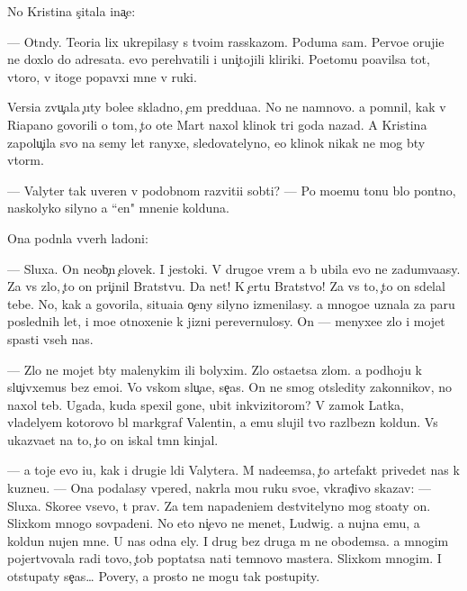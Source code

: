 \documentclass[10pt]{book}
\begin{document}
No Kristina s{\c}itala ina{\c}e:

— Otn{\iu}dy. Teori{\y}a lix ukrepilasy s tvo{\y}im rasskazom. Poduma{\y} sam. Pervo{\y}e oruji{\y}e ne doxlo do adresata. {\Y}evo perehvatili i uni{\c}tojili kliriki. Poetomu po{\y}avilsa tot, vtoro{\y}, v itoge popavxi{\y} mne v ruki.

Versi{\y}a zvu{\c}ala {\c}uty bole{\y}e skladno, {\c}em pred{\yi}du{\x}a{\y}a. No ne namnovo. {\Y}a pomnil, kak v Riapano govorili o tom, {\c}to ote{\q} Mart naxol klinok tri goda nazad. A Kristina zapolu{\c}ila svo{\y} na semy let ranyxe, sledovatelyno, {\y}e{\y}o klinok nikak ne mog b{\yi}ty vtor{\yi}m.

— Valyter tak uveren v podobnom razviti{\y}i sob{\yi}ti{\y}? — Po mo{\y}emu tonu b{\yi}lo pon{\ia}tno, naskolyko silyno {\y}a ``{\q}en{\iu}" mneni{\y}e kolduna.

Ona podn{\ia}la vverh ladoni:

— Sluxa{\y}. On neob{\yi}{\c}n{\yi}{\y} {\c}elovek. I jestoki{\y}. V drugo{\y}e vrem{\ia} {\y}a b{\yi} ubila {\y}evo ne zadum{\yi}va{\y}asy. Za vs{\e} zlo, {\c}to on pri{\c}inil Bratstvu. Da net! K {\c}ertu Bratstvo! Za vs{\e} to, {\c}to on sdelal tebe. No, kak {\y}a govorila, situa{\q}i{\y}a o{\c}eny silyno izmenilasy. {\Y}a mnogo{\y}e uznala za paru poslednih let, i mo{\y}e otnoxeni{\y}e k jizni perevernulosy. On — menyxe{\y}e zlo i mojet spasti vseh nas.

— Zlo ne mojet b{\yi}ty malenykim ili bolyxim. Zlo osta{\y}etsa zlom. {\Y}a podhoju k slu{\c}ivxemus{\ia} bez emo{\q}i{\y}. Vo vs{\ia}kom slu{\c}a{\y}e, se{\y}{\c}as. On ne smog otsledity zakonnikov, no naxol teb{\ia}. Ugada{\y}, kuda spexil gone{\q}, ubit{\yi}{\y} inkvizitorom? V zamok Latka, vladely{\q}em kotorovo b{\yi}l markgraf Valentin, a {\y}emu slujil tvo{\y} razl{\iu}bezn{\yi}{\y} koldun. Vs{\e} ukaz{\yi}va{\y}et na to, {\c}to on iskal t{\e}mn{\yi}{\y} kinjal.

— {\Y}a toje {\y}evo i{\x}u, kak i drugi{\y}e l{\iu}di Valytera. M{\yi} nade{\y}emsa, {\c}to artefakt privedet nas k kuzne{\q}u. — Ona podalasy vpered, nakr{\yi}la mo{\y}u ruku svo{\y}e{\y}, vkrad{\c}ivo skazav: — Sluxa{\y}. Skore{\y}e vsevo, t{\yi} prav. Za tem napadeni{\y}em de{\y}stvitelyno mog sto{\y}aty on. Slixkom mnogo sovpadeni{\y}. No eto ni{\c}evo ne men{\ia}{\y}et, Ludwig. {\Y}a nujna {\y}emu, a koldun nujen mne. U nas odna {\q}ely. I drug bez druga m{\yi} ne obo{\y}demsa. {\Y}a mnogim pojertvovala radi tovo, {\c}tob{\yi} pop{\yi}tatsa na{\y}ti temnovo mastera. Slixkom mnogim. I otstupaty se{\y}{\c}as… Povery, {\y}a prosto ne mogu tak postupity.
\end{document}
